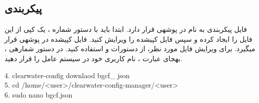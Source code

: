 \subsection{پیکربندی }
فایل پیکربندی  به نام  در پوشه\nf ی  قرار دارد. ابتدا باید با دستور شماره ، یک کپی از این فایل را ایجاد کرده و سپس فایل کپی\nf شده را ویرایش کنید. فایل کپی\nf شده در پوشه\nf ی  قرار می\nf گیرد. برای ویرایش فایل مورد نظر، از دستورات  و  استفاده کنید. در دستور شماره\nf ی ، به\nf جای عبارت ، نام کاربری خود در سیستم عامل را قرار دهید.
\begin{latin}
\setlength{\parindent}{0ex}
4. clearwater-config  downlaod  bgcf\_ json \\
5. cd /home/<user>/clearwater-config-manager/<user> \\
6. sudo nano bgcf.json \\
\end{latin}

